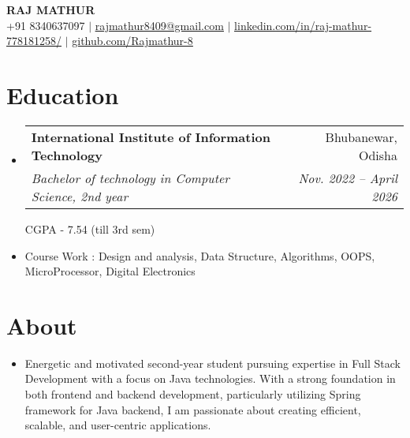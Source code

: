 \documentclass[letterpaper,11pt]{article}
\makeatletter
\newcommand{\resumeItem}[1]{
  \item\small{
    {#1 \vspace{-2pt}}
  }
}
\newcommand{\resumeSubheading}[4]{
  \vspace{-2pt}\item
    \begin{tabular*}{0.97\textwidth}[t]{l@{\extracolsep{\fill}}r}
      \textbf{#1} & #2 \\
      \textit{\small#3} & \textit{\small #4} \\
    \end{tabular*}\vspace{-7pt}
}
\newcommand{\resumeSubHeadingListStart}{\begin{itemize}[leftmargin=0.15in, label={}]}
\newcommand{\resumeSubHeadingListEnd}{\end{itemize}}
\makeatother
\begin{document}

\begin{center}
    \textbf{\Huge \scshape RAJ MATHUR} \\ \vspace{1pt}
    \small +91 8340637097 $|$ \href{mailto:x@x.com}{\underline{rajmathur8409@gmail.com}} $|$ 
    \href{https://linkedin.com/in/...}{\underline{linkedin.com/in/raj-mathur-778181258/}} $|$
    \href{https://github.com/...}{\underline{github.com/Rajmathur-8}}
\end{center}


\section{Education}
  \resumeSubHeadingListStart
    \resumeSubheading
      {International Institute of Information Technology}{Bhubanewar, Odisha}
      {Bachelor of technology in Computer Science, 2nd year}{Nov. 2022 -- April 2026}
      
     { {CGPA - 7.54 (till 3rd sem)}}
      \resumeItem{Course Work : Design and analysis, Data Structure, Algorithms, OOPS, MicroProcessor, Digital Electronics}
  \resumeSubHeadingListEnd

\section{About}
  \resumeSubHeadingListStart
      \resumeItem{Energetic and motivated second-year student pursuing expertise in Full Stack Development with a focus on Java technologies. With a strong foundation in both frontend and backend development, particularly utilizing Spring framework for Java backend, I am passionate about creating efficient, scalable, and user-centric applications. }
  \resumeSubHeadingListEnd


      
\end{document}

